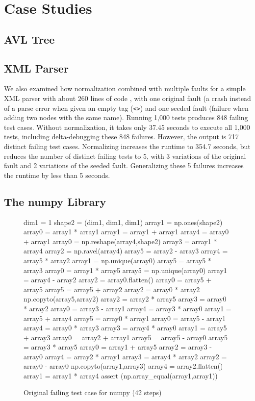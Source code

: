 \section {Case Studies}

\subsection{AVL Tree}

\subsection{XML Parser}

We also examined how normalization combined with multiple faults for a
simple XML parser with about 260 lines of code \cite{myxml}, with one
original fault (a crash instead of a parse error when given an empty
tag ({\tt <>}) and one seeded fault (failure when adding two nodes
with the same name).  Running 1,000 tests produces 848 failing test
cases.  Without normalization, it takes only 37.45 seconds to execute
all 1,000 tests, including delta-debugging these 848 failures.
However, the output is 717 distinct failing test cases.  Normalizing
increases the runtime to 354.7 seconds, but reduces the number of
distinct failing tests to 5, with 3 variations of the original fault
and 2 variations of the seeded fault.  Generalizing these 5 failures
increases the runtime by less than 5 seconds.

\subsection{The numpy Library}

\begin{figure}
{\scriptsize
\begin{code}
 dim1 = 1 
 shape2 = (dim1, dim1, dim1) 
 array1 = np.ones(shape2) 
 array0 = array1 * array1 
 array1 = array1 + array1 
 array4 = array0 + array1 
 array0 = np.reshape(array4,shape2) 
 array3 = array1 * array4 
 array2 = np.ravel(array4) 
 array5 = array2 - array3 
 array4 = array5 * array2 
 array1 = np.unique(array0) 
 array5 = array5 * array3 
 array0 = array1 * array5 
 array5 = np.unique(array0) 
 array1 = array4 - array2 
 array2 = array0.flatten() 
 array0 = array5 + array5 
 array5 = array5 + array2 
 array2 = array0 * array2 
 np.copyto(array5,array2) 
 array2 = array2 * array5 
 array3 = array0 * array2 
 array0 = array3 - array1 
 array4 = array3 * array0 
 array1 = array5 + array4 
 array5 = array0 * array1 
 array0 = array5 - array1 
 array4 = array0 * array3 
 array3 = array4 * array0 
 array1 = array5 + array3 
 array0 = array2 + array1 
 array5 = array5 - array0 
 array5 = array3 * array5 
 array0 = array1 + array5 
 array2 = array3 - array0 
 array4 = array2 * array1 
 array3 = array4 * array2 
 array2 = array0 - array0 
 np.copyto(array1,array3) 
 array4 = array2.flatten() 
 array1 = array1 * array4
 assert (np.array\_equal(array1,array1))
\end{code}
}
\caption{Original failing test case for numpy (42 steps)}
\end{figure}

